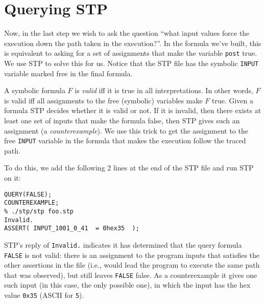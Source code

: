 \section {Querying STP}

Now, in the last step we wish to ask the question ``what input values
force the execution down the path taken in the execution?''.  In the
formula we've built, this is equivalent to asking for a set of
assignments that make the variable \verb'post' true. We use STP to
solve this for us.  Notice that the STP file has the symbolic
\verb'INPUT' variable marked free in the final formula.

A symbolic formula $F$ is \emph{valid} iff it is true in all
interpretations.  In other words, $F$ is valid iff all assignments to
the free (symbolic) variables make $F$ true. Given a formula STP
decides whether it is valid or not. If it is invalid, then there
exists at least one set of inputs that make the formula false, then
STP gives such an assignment (a {\em counterexample}). We use this
trick to get the assignment to the free \verb'INPUT' variable in the
formula that makes the execution follow the traced path.

To do this, we add the following 2 lines at the end of the STP file
and run STP on it:

\begin{Verbatim}[fontsize=\relsize{0}, frame=lines, framesep=.5em]
% cat >>foo.stp
QUERY(FALSE);
COUNTEREXAMPLE;
% ./stp/stp foo.stp
Invalid.
ASSERT( INPUT_1001_0_41  = 0hex35  );
\end{Verbatim}

STP's reply of \verb'Invalid.' indicates it has determined that the
query formula \verb'FALSE' is not valid: there is an assignment to the
program inputs that satisfies the other assertions in the file (i.e.,
would lead the program to execute the same path that was observed),
but still leaves \verb'FALSE' false. As a counterexample it gives one
such input (in this case, the only possible one), in which the input
has the hex value \verb'0x35' (ASCII for \texttt{5}).


